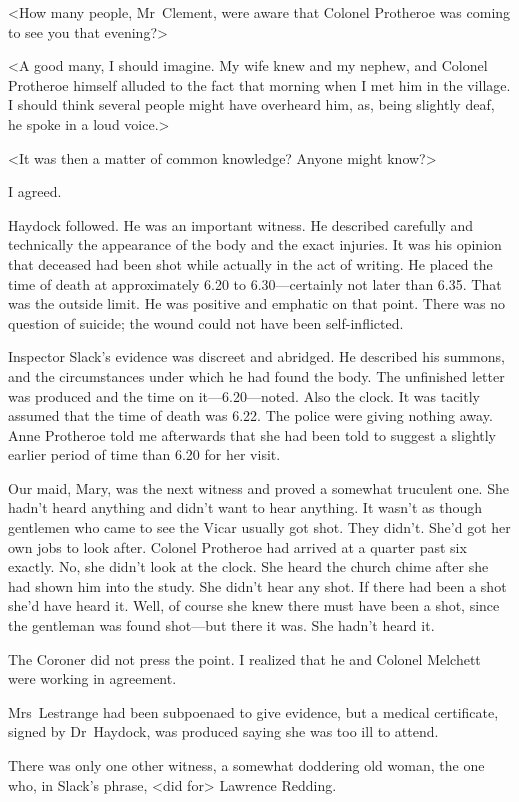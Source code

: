 <How many people, Mr~Clement, were aware that Colonel Protheroe was coming to see you that evening?>

<A good many, I should imagine. My wife knew and my nephew, and Colonel Protheroe himself alluded to the fact that morning when I met him in the village. I should think several people might have overheard him, as, being slightly deaf, he spoke in a loud voice.>

<It was then a matter of common knowledge? Anyone might know?>

I agreed.

Haydock followed. He was an important witness. He described carefully and technically the appearance of the body and the exact injuries. It was his opinion that deceased had been shot while actually in the act of writing. He placed the time of death at approximately 6.20 to 6.30—certainly not later than 6.35. That was the outside limit. He was positive and emphatic on that point. There was no question of suicide; the wound could not have been self-inflicted.

Inspector Slack's evidence was discreet and abridged. He described his summons, and the circumstances under which he had found the body. The unfinished letter was produced and the time on it—6.20—noted. Also the clock. It was tacitly assumed that the time of death was 6.22. The police were giving nothing away. Anne Protheroe told me afterwards that she had been told to suggest a slightly earlier period of time than 6.20 for her visit.

Our maid, Mary, was the next witness and proved a somewhat truculent one. She hadn't heard anything and didn't want to hear anything. It wasn't as though gentlemen who came to see the Vicar usually got shot. They didn't. She'd got her own jobs to look after. Colonel Protheroe had arrived at a quarter past six exactly. No, she didn't look at the clock. She heard the church chime after she had shown him into the study. She didn't hear any shot. If there had been a shot she'd have heard it. Well, of course she knew there must have been a shot, since the gentleman was found shot—but there it was. She hadn't heard it.

The Coroner did not press the point. I realized that he and Colonel Melchett were working in agreement.

Mrs~Lestrange had been subpoenaed to give evidence, but a medical certificate, signed by Dr~Haydock, was produced saying she was too ill to attend.

There was only one other witness, a somewhat doddering old woman, the one who, in Slack's phrase, <did for> Lawrence Redding.

